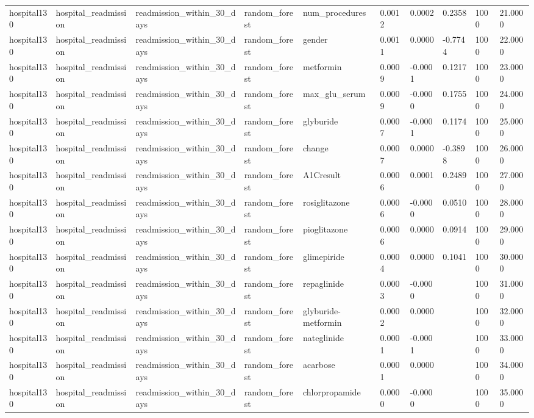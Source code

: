 \begin{tabular}{llllllllll}
hospital130 & hospital\_readmission & readmission\_within\_30\_days & random\_forest & num\_procedures & 0.0012 & 0.0002 & 0.2358 & 1000 & 21.0000 \\
hospital130 & hospital\_readmission & readmission\_within\_30\_days & random\_forest & gender & 0.0011 & 0.0000 & -0.7744 & 1000 & 22.0000 \\
hospital130 & hospital\_readmission & readmission\_within\_30\_days & random\_forest & metformin & 0.0009 & -0.0001 & 0.1217 & 1000 & 23.0000 \\
hospital130 & hospital\_readmission & readmission\_within\_30\_days & random\_forest & max\_glu\_serum & 0.0009 & -0.0000 & 0.1755 & 1000 & 24.0000 \\
hospital130 & hospital\_readmission & readmission\_within\_30\_days & random\_forest & glyburide & 0.0007 & -0.0001 & 0.1174 & 1000 & 25.0000 \\
hospital130 & hospital\_readmission & readmission\_within\_30\_days & random\_forest & change & 0.0007 & 0.0000 & -0.3898 & 1000 & 26.0000 \\
hospital130 & hospital\_readmission & readmission\_within\_30\_days & random\_forest & A1Cresult & 0.0006 & 0.0001 & 0.2489 & 1000 & 27.0000 \\
hospital130 & hospital\_readmission & readmission\_within\_30\_days & random\_forest & rosiglitazone & 0.0006 & -0.0000 & 0.0510 & 1000 & 28.0000 \\
hospital130 & hospital\_readmission & readmission\_within\_30\_days & random\_forest & pioglitazone & 0.0006 & 0.0000 & 0.0914 & 1000 & 29.0000 \\
hospital130 & hospital\_readmission & readmission\_within\_30\_days & random\_forest & glimepiride & 0.0004 & 0.0000 & 0.1041 & 1000 & 30.0000 \\
hospital130 & hospital\_readmission & readmission\_within\_30\_days & random\_forest & repaglinide & 0.0003 & -0.0000 &  & 1000 & 31.0000 \\
hospital130 & hospital\_readmission & readmission\_within\_30\_days & random\_forest & glyburide-metformin & 0.0002 & 0.0000 &  & 1000 & 32.0000 \\
hospital130 & hospital\_readmission & readmission\_within\_30\_days & random\_forest & nateglinide & 0.0001 & -0.0001 &  & 1000 & 33.0000 \\
hospital130 & hospital\_readmission & readmission\_within\_30\_days & random\_forest & acarbose & 0.0001 & 0.0000 &  & 1000 & 34.0000 \\
hospital130 & hospital\_readmission & readmission\_within\_30\_days & random\_forest & chlorpropamide & 0.0000 & -0.0000 &  & 1000 & 35.0000 \\

\end{tabular}
